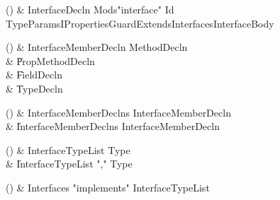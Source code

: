 \begin{bbgrammarappendix}{3.6in}

() & InterfaceDecln \label{prod:InterfaceDecln}  \: Mods\opt \xcd"interface" Id TypeParamsI\opt Properties\opt Guard\opt ExtendsInterfaces\opt InterfaceBody  \\


\end{bbgrammarappendix}

\begin{bbgrammarappendix}{3.0in}

() & InterfaceMemberDecln \label{prod:InterfaceMemberDecln}  \: MethodDecln  \\

 &    \| PropMethodDecln \\
 &    \| FieldDecln \\
 &    \| TypeDecln \\

\end{bbgrammarappendix}

\begin{bbgrammarappendix}{2.9in}

() & InterfaceMemberDeclns \label{prod:InterfaceMemberDeclns}  \: InterfaceMemberDecln  \\

 &    \| InterfaceMemberDeclns InterfaceMemberDecln \\

\end{bbgrammarappendix}

\begin{bbgrammarappendix}{3.3in}

() & InterfaceTypeList \label{prod:InterfaceTypeList}  \: Type  \\

 &    \| InterfaceTypeList \xcd"," Type \\

\end{bbgrammarappendix}

\begin{bbgrammarappendix}{4.0in}

() & Interfaces \label{prod:Interfaces}  \: \xcd"implements" InterfaceTypeList  \\


\end{bbgrammarappendix}

